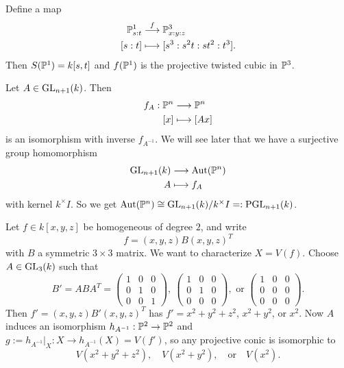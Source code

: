 \begin{example}
  Define a map
  \begin{align*}
    \mathbb{P}^1_{s : t}
    &\overset{f}{\longrightarrow}
    \mathbb{P}^3_{x : y : z} \\
    [s : t]
    &\longmapsto
    [s^3 : s^2 t : s t^2 : t^3].
  \end{align*}
  Then $S(\mathbb{P}^1) = k[s, t]$ and
  $f(\mathbb{P}^1)$ is the projective
  twisted cubic in $\mathbb{P}^3$.
\end{example}

\begin{example}
  Let $A \in \operatorname{GL}_{n + 1}(k)$.
  Then
  \begin{align*}
    f_A : \mathbb{P}^n
    &\longrightarrow \mathbb{P}^n \\
    [x] &\longmapsto [Ax]
  \end{align*}
  is an isomorphism with inverse
  $f_{A^{-1}}$. We will see later
  that we have a surjective group
  homomorphism
  \begin{align*}
    \operatorname{GL}_{n + 1}(k)
    &\longrightarrow \operatorname{Aut}(\mathbb{P}^n) \\
    A &\longmapsto f_A
  \end{align*}
  with kernel $k^\times I$.
  So we get
  $\operatorname{Aut}(\mathbb{P}^n) \cong \operatorname{GL}_{n + 1}(k) / k^\times I =: \operatorname{PGL}_{n + 1}(k)$.
\end{example}

\begin{example}[Conics]
  Let $f \in k[x, y, z]$ be homogeneous
  of degree $2$, and write
  \[
    f =
    (x, y, z) B (x, y, z)^T
  \]
  with $B$ a symmetric $3 \times 3$
  matrix. We want to characterize
  $X = V(f)$.
  Choose
  $A \in \operatorname{GL}_3(k)$ such that
  \[
    B' = A B A^T =
    \begin{pmatrix}
      1 & 0 & 0 \\
      0 & 1 & 0 \\
      0 & 0 & 1
    \end{pmatrix},\
    \begin{pmatrix}
      1 & 0 & 0 \\
      0 & 1 & 0 \\
      0 & 0 & 0
    \end{pmatrix},
    \text{ or }
    \begin{pmatrix}
      1 & 0 & 0 \\
      0 & 0 & 0 \\
      0 & 0 & 0
    \end{pmatrix}.
  \]
  Then $f' = (x, y, z) B' (x, y, z)^T$
  has $f' = x^2 + y^2 + z^2$,
  $x^2 + y^2$, or $x^2$. Now
  $A$ induces an isomorphism
  $h_{A^{-1}} : \mathbb{P}^2 \to \mathbb{P}^2$
  and $g := h_{A^{-1}}|_{X} : X \to h_{A^{-1}}(X) = V(f')$,
  so any projective conic is isomorphic
  to
  \[
    V(x^2 + y^2 + z^2), \quad
    V(x^2 + y^2), \quad
    \text{or} \quad
    V(x^2).
  \]
\end{example}

